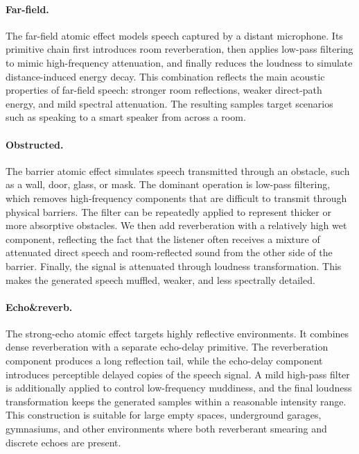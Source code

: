 \documentclass{llmxive}
\begin{document}
\paragraph{Far-field.}
The far-field atomic effect models speech captured by a distant microphone.
Its primitive chain first introduces room reverberation, then applies low-pass
filtering to mimic high-frequency attenuation, and finally reduces the loudness
to simulate distance-induced energy decay. This combination reflects the main
acoustic properties of far-field speech: stronger room reflections, weaker
direct-path energy, and mild spectral attenuation. The resulting samples target
scenarios such as speaking to a smart speaker from across a room.

\paragraph{Obstructed.}
The barrier atomic effect simulates speech transmitted through an obstacle,
such as a wall, door, glass, or mask. The dominant operation is low-pass
filtering, which removes high-frequency components that are difficult to
transmit through physical barriers. The filter can be repeatedly applied to
represent thicker or more absorptive obstacles. We then add reverberation with
a relatively high wet component, reflecting the fact that the listener often
receives a mixture of attenuated direct speech and room-reflected sound from
the other side of the barrier. Finally, the signal is attenuated through
loudness transformation. This makes the generated speech muffled, weaker, and
less spectrally detailed.

\paragraph{Echo\&reverb.}
The strong-echo atomic effect targets highly reflective environments. It
combines dense reverberation with a separate echo-delay primitive. The
reverberation component produces a long reflection tail, while the echo-delay
component introduces perceptible delayed copies of the speech signal. A mild
high-pass filter is additionally applied to control low-frequency muddiness,
and the final loudness transformation keeps the generated samples within a
reasonable intensity range. This construction is suitable for large empty
spaces, underground garages, gymnasiums, and other environments where both
reverberant smearing and discrete echoes are present.
\end{document}
